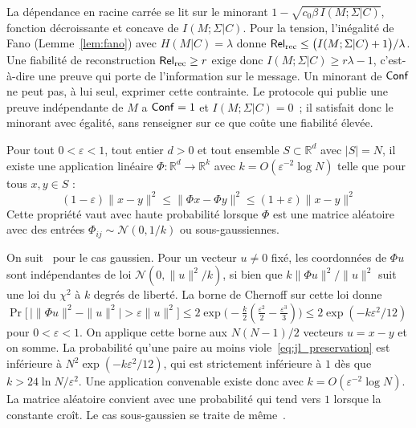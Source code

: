 \begin{sloppypar}
\begin{Preuve}
La d\'ependance en racine carr\'ee se lit sur le minorant
$1 - \sqrt{c_0\beta\, I(M;\Sigma|C)}$, fonction d\'ecroissante et concave de
$I(M;\Sigma|C)$. Pour la tension, l'in\'egalit\'e de Fano
(Lemme~\ref{lem:fano}) avec $H(M|C) = \lambda$ donne
$\mathsf{Rel}_{\mathrm{rec}} \leq \bigl(I(M;\Sigma|C) + 1\bigr)/\lambda$. Une fiabilit\'e de
reconstruction $\mathsf{Rel}_{\mathrm{rec}} \geq r$ exige donc $I(M;\Sigma|C) \geq r\lambda - 1$,
c'est-\`a-dire une preuve qui porte de l'information sur le message. Un
minorant de $\mathsf{Conf}$ ne peut pas, \`a lui seul, exprimer cette contrainte. Le
protocole qui publie une preuve ind\'ependante de $M$ a $\mathsf{Conf} = 1$ et
$I(M;\Sigma|C) = 0$~; il satisfait donc le minorant avec \'egalit\'e, sans
renseigner sur ce que co\^ute une fiabilit\'e \'elev\'ee.
\end{Preuve}

\begin{lemma}\label{lem:johnson_lindenstrauss}
Pour tout $0 < \varepsilon < 1$, tout entier $d > 0$ et tout ensemble 
 $S \subset \mathbb{R}^d$ avec $|S| = N$, il existe une application lin\'eaire 
 $\Phi: \mathbb{R}^d \to \mathbb{R}^k$ avec $k = O(\varepsilon^{-2} \log N)$ 
telle que pour tous $x, y \in S$ :
\begin{equation}
(1-\varepsilon)\|x-y\|^2 \leq \|\Phi x - \Phi y\|^2 \leq (1+\varepsilon)\|x-y\|^2
\label{eq:jl_preservation}
\end{equation}
Cette propri\'et\'e vaut avec haute probabilit\'e lorsque $\Phi$ est une matrice al\'eatoire avec des 
entr\'ees $\Phi_{ij} \sim \mathcal{N}(0, 1/k)$ ou sous-gaussiennes.
\end{lemma}

\begin{Preuve}
On suit~\cite{DasguptaGupta03} pour le cas gaussien. Pour un vecteur
$u \neq 0$ fix\'e, les coordonn\'ees de $\Phi u$ sont ind\'ependantes de loi
$\mathcal{N}(0, \|u\|^2/k)$, si bien que $k\|\Phi u\|^2/\|u\|^2$ suit une loi du
$\chi^2$ \`a $k$ degr\'es de libert\'e. La borne de Chernoff sur cette loi donne
$\Pr\bigl[\,\bigl|\|\Phi u\|^2 - \|u\|^2\bigr| > \varepsilon\|u\|^2\bigr]
\leq 2\exp\bigl(-\tfrac{k}{2}(\tfrac{\varepsilon^2}{2} - \tfrac{\varepsilon^3}{3})\bigr)
\leq 2\exp(-k\varepsilon^2/12)$ pour $0 < \varepsilon < 1$. On applique cette
borne aux $N(N-1)/2$ vecteurs $u = x - y$ et on somme. La probabilit\'e qu'une
paire au moins viole~\eqref{eq:jl_preservation} est inf\'erieure \`a
$N^2\exp(-k\varepsilon^2/12)$, qui est strictement inf\'erieure \`a $1$ d\`es que
$k > 24\ln N/\varepsilon^2$. Une application convenable existe donc avec
$k = O(\varepsilon^{-2}\log N)$. La matrice al\'eatoire convient avec une
probabilit\'e qui tend vers $1$ lorsque la constante cro\^it. Le cas
sous-gaussien se traite de m\^eme~\cite{Achlioptas2003}.
\end{Preuve}


\end{sloppypar}
